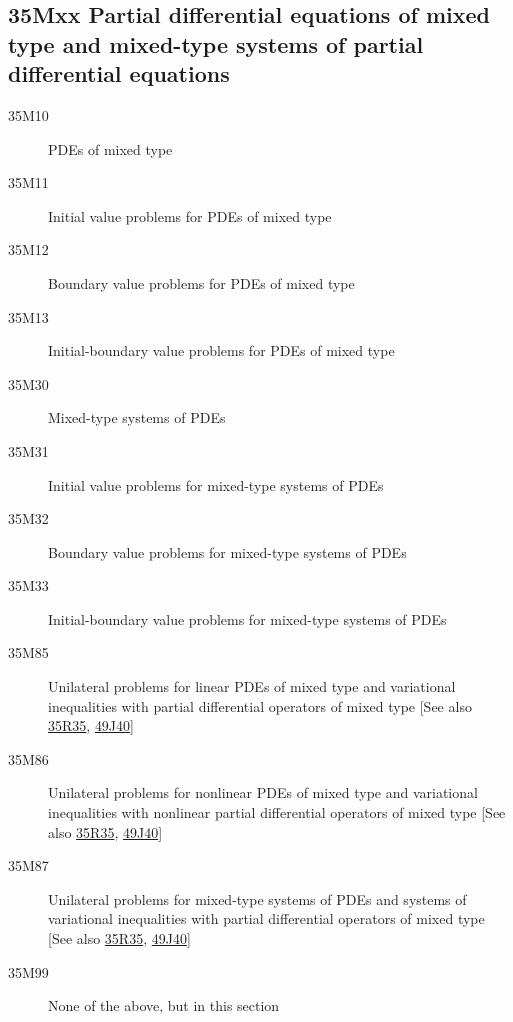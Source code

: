 \subsection*{35Mxx Partial differential equations of mixed type  and mixed-type systems of partial differential equations}\label{35Mxx}
\begin{description}  
\item [35M10]\label{35M10} PDEs of mixed type
\item [35M11]\label{35M11} Initial value problems for PDEs of mixed type
\item [35M12]\label{35M12} Boundary value problems for PDEs of mixed type
\item [35M13]\label{35M13} Initial-boundary value problems for PDEs of mixed type
\item [35M30]\label{35M30} Mixed-type systems of PDEs
\item [35M31]\label{35M31} Initial value problems for mixed-type systems of PDEs
\item [35M32]\label{35M32} Boundary value problems for mixed-type systems of PDEs
\item [35M33]\label{35M33} Initial-boundary value problems for mixed-type systems of PDEs
\item [35M85]\label{35M85} Unilateral problems for linear PDEs of mixed type and variational inequalities with partial differential operators of mixed type [See also \hyperref[35R35]{35R35}, \hyperref[49J40]{49J40}]
\item [35M86]\label{35M86} Unilateral problems for nonlinear PDEs of mixed type and variational inequalities with nonlinear partial differential operators of mixed type [See also \hyperref[35R35]{35R35}, \hyperref[49J40]{49J40}]
\item [35M87]\label{35M87} Unilateral problems for mixed-type systems of PDEs and systems of  variational inequalities with partial differential operators of mixed type [See also \hyperref[35R35]{35R35}, \hyperref[49J40]{49J40}]
\item [35M99]\label{35M99} None of the above, but in this section
\end{description}
